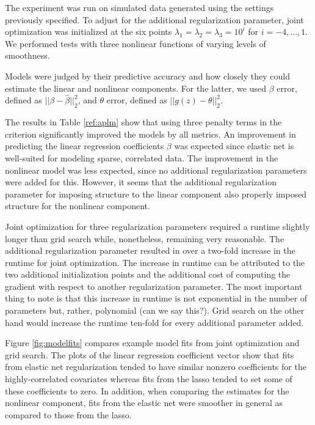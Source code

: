 \documentclass[10pt,letterpaper]{article}
\begin{document}
The experiment was run on simulated data generated using the settings previously specified. To adjust for the additional regularization parameter, joint optimization was initialized at the six points $\lambda_1 = \lambda_2 = \lambda_3 =10^i$ for $i=-4, ..., 1$. We performed tests with three nonlinear functions of varying levels of smoothness.

Models were judged by their predictive accuracy and how closely they could estimate the linear and nonlinear components. For the latter, we used $\beta$ error, defined as $||\beta - \hat \beta||_2^2$, and $\theta$ error, defined as $|| g(z) - \theta ||_2^2$.

The results in Table \ref{ref:aplm} show that using three penalty terms in the criterion significantly improved the models by all metrics. An improvement in predicting the linear regression coefficients $\beta$ was expected since elastic net is well-suited for modeling sparse, correlated data. The improvement in the nonlinear model was less expected, since no additional regularization parameters were added for this. However, it seems that the additional regularization parameter for imposing structure to the linear component also properly imposed structure for the nonlinear component.

Joint optimization for three regularization parameters required a runtime slightly longer than grid search while, nonetheless, remaining very reasonable. The additional regularization parameter resulted in over a two-fold increase in the runtime for joint optimization. The increase in runtime can be attributed to the two additional initialization points and the additional cost of computing the gradient with respect to another regularization parameter. The most important thing to note is that this increase in runtime is not exponential in the number of parameters but, rather, polynomial (can we say this?). Grid search on the other hand would increase the runtime ten-fold for every additional parameter added.

Figure \ref{fig:modelfits} compares example model fits from joint optimization and grid search. The plots of the linear regression coefficient vector show that fits from elastic net regularization tended to have similar nonzero coefficients for the highly-correlated covariates whereas fits from the lasso tended to set some of these coefficients to zero. In addition, when comparing the estimates for the nonlinear component, fits from the elastic net were smoother in general as compared to those from the lasso.
\end{document}
